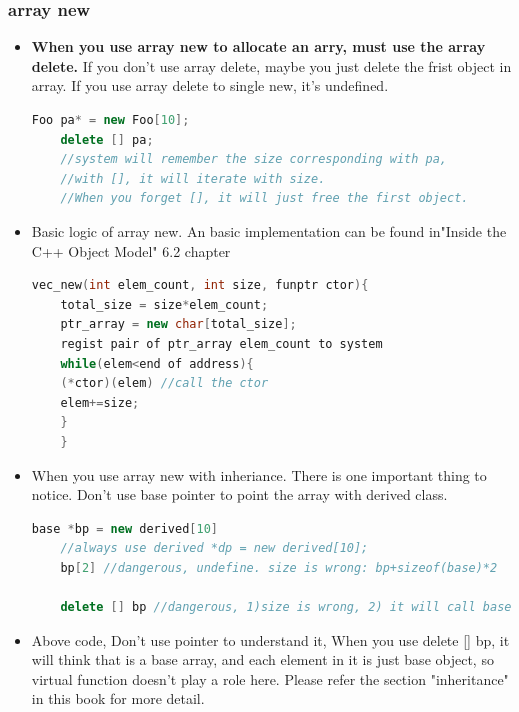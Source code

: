 \documentclass[a4paper,12pt,twoside]{book}
\begin{document}
\subsubsection{array new}
\begin{itemize}
	\item \textbf{When you use array new to allocate an arry, must use the array delete.} If you don't use array delete, maybe you just delete the frist object in array. If you use array delete to single new, it's undefined. 
	\begin{lstlisting}[frame=single, language=c++]
	Foo pa* = new Foo[10];
	delete [] pa;
	//system will remember the size corresponding with pa, 
	//with [], it will iterate with size. 
	//When you forget [], it will just free the first object.
	\end{lstlisting}
	\item Basic logic of array new. An basic implementation can be found in"Inside the C++ Object Model" 6.2 chapter
	\begin{lstlisting}[frame=single, language=c++]
	vec_new(int elem_count, int size, funptr ctor){
	total_size = size*elem_count;
	ptr_array = new char[total_size];
	regist pair of ptr_array elem_count to system
	while(elem<end of address){
	(*ctor)(elem) //call the ctor
	elem+=size;
	}
	}
	\end{lstlisting}
	\item When you use array new with inheriance. There is one important thing to notice. Don't use base pointer to point the array with derived class. 
	\begin{lstlisting}[frame=single, language=c++]
	base *bp = new derived[10]
	//always use derived *dp = new derived[10];
	bp[2] //dangerous, undefine. size is wrong: bp+sizeof(base)*2
	
	delete [] bp //dangerous, 1)size is wrong, 2) it will call base::~base() destructor. 
	\end{lstlisting}
	\item Above code, Don't use pointer to understand it, When you use delete [] bp, it will think that is a base array, and each element in it is just base object, so virtual function doesn't play a role here. Please refer the section "inheritance" in this book for more detail.
\end{itemize}
\end{document}
